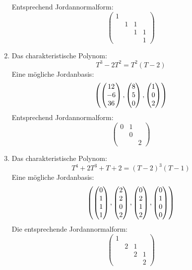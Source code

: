 \documentclass[a4paper, 10pt]{scrartcl}
\begin{document}
\begin{solution}
\begin{enumerate}
\[      \]
      Entsprechend Jordannormalform:
      \[
        \begin{pmatrix}
          1 &   &   &   \\
            & 1 & 1 &   \\
            &   & 1 & 1 \\
            &   &   & 1
        \end{pmatrix}
      \]
    \item
      Das charakteristische Polynom:
      \[
        T^3 - 2 T^2 = T^2 (T - 2)
      \]
      Eine mögliche Jordanbasis:
      \[
        \left( \begin{pmatrix} 12 \\ -6 \\ 36 \end{pmatrix}, \begin{pmatrix} 8 \\ 5 \\ 0 \end{pmatrix}, \begin{pmatrix} 1 \\ 0 \\ 2 \end{pmatrix} \right)
      \]
      Entsprechend Jordannormalform:
      \[
        \begin{pmatrix}
          0 & 1 &   \\
            & 0 &   \\
            &   & 2
        \end{pmatrix}
      \]
    \item
      Das charakteristische Polynom:
      \[
        T^4 + 2 T^3 + T + 2 = (T - 2)^3 (T - 1)
      \]
      Eine mögliche Jordanbasis:
      \[
        \left(
          \begin{pmatrix} 0 \\ 1 \\ 1 \\ 1 \end{pmatrix},
          \begin{pmatrix} 2 \\ 2 \\ 0 \\ 2 \end{pmatrix},
          \begin{pmatrix} 0 \\ 2 \\ 1 \\ 2 \end{pmatrix},
          \begin{pmatrix} 0 \\ 1 \\ 0 \\ 0 \end{pmatrix}
        \right)
      \]
      Die entsprechende Jordannormalform:
      \[
        \begin{pmatrix}
          1 &   &   &   \\
            & 2 & 1 &   \\
            &   & 2 & 1 \\
            &   &   & 2
        \end{pmatrix}
      \]
  \end{enumerate}
\end{solution}
\end{document}
